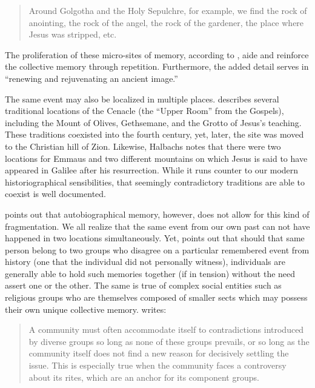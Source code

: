 \begin{quote} Around Golgotha and the Holy Sepulchre, for example, we find the rock of anointing, the rock of the angel, the rock of the gardener, the place where Jesus was stripped, etc.\autocite[220]{halbwachs1992} \end{quote}  

The proliferation of these micro-sites of memory, according to \halbwachs, aide and reinforce the collective memory through repetition. Furthermore, the added detail serves in ``renewing and rejuvenating an ancient image.''\autocite[220]{halbwachs1992}  

The same event may also be localized in multiple places. \halbwachs describes several traditional locations of the Cenacle (the ``Upper Room'' from the Gospels), including the Mount of Olives, Gethsemane, and the Grotto of Jesus's teaching. These traditions coexisted into the fourth century, yet, later, the site was moved to the Christian hill of Zion. Likewise, Halbachs notes that there were two locations for Emmaus and two different mountains on which Jesus is said to have appeared in Galilee after his resurrection. While it runs counter to our modern historiographical sensibilities, that seemingly contradictory traditions are able to coexist is well documented.  

\halbwachs points out that autobiographical memory, however, does not allow for this kind of fragmentation. We all realize that the same event from our own past can not have happened in two locations simultaneously. Yet, \halbwachs points out that should that same person belong to two groups who disagree on a particular remembered event from history (one that the individual did not personally witness), individuals are generally able to hold such memories together (if in tension) without the need assert one or the other. The same is true of complex social entities such as religious groups who are themselves composed of smaller sects which may possess their own unique collective memory. \halbwachs writes:  

\begin{quote} A community must often accommodate itself to contradictions introduced by diverse groups so long as none of these groups prevails, or so long as the community itself does not find a new reason for decisively settling the issue. This is especially true when the community faces a controversy about its rites, which are an anchor for its component groups.\autocite[224]{halbwachs1992} \end{quote} 